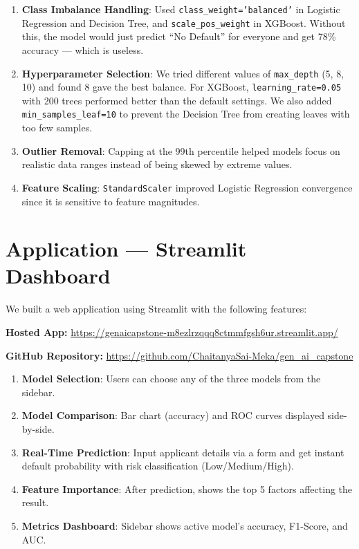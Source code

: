 \documentclass[12pt, a4paper]{article}
\begin{document}
\begin{enumerate}[leftmargin=2cm]
  \item \textbf{Class Imbalance Handling}: Used \texttt{class\_weight='balanced'} in Logistic Regression and Decision Tree, and \texttt{scale\_pos\_weight} in XGBoost. Without this, the model would just predict ``No Default'' for everyone and get 78\% accuracy --- which is useless.
  \item \textbf{Hyperparameter Selection}: We tried different values of \texttt{max\_depth} (5, 8, 10) and found 8 gave the best balance. For XGBoost, \texttt{learning\_rate=0.05} with 200 trees performed better than the default settings. We also added \texttt{min\_samples\_leaf=10} to prevent the Decision Tree from creating leaves with too few samples.
  \item \textbf{Outlier Removal}: Capping at the 99th percentile helped models focus on realistic data ranges instead of being skewed by extreme values.
  \item \textbf{Feature Scaling}: \texttt{StandardScaler} improved Logistic Regression convergence since it is sensitive to feature magnitudes.
\end{enumerate}

\section{Application --- Streamlit Dashboard}

We built a web application using Streamlit \cite{streamlit} with the following features:

\textbf{Hosted App:} \url{https://genaicapstone-m8ezlrzqqq8ctmmfgsh6ur.streamlit.app/}

\textbf{GitHub Repository:} \url{https://github.com/ChaitanyaSai-Meka/gen_ai_capstone}

\begin{enumerate}[leftmargin=2cm]
  \item \textbf{Model Selection}: Users can choose any of the three models from the sidebar.
  \item \textbf{Model Comparison}: Bar chart (accuracy) and ROC curves displayed side-by-side.
  \item \textbf{Real-Time Prediction}: Input applicant details via a form and get instant default probability with risk classification (Low/Medium/High).
  \item \textbf{Feature Importance}: After prediction, shows the top 5 factors affecting the result.
  \item \textbf{Metrics Dashboard}: Sidebar shows active model's accuracy, F1-Score, and AUC.
\end{enumerate}
\end{document}
